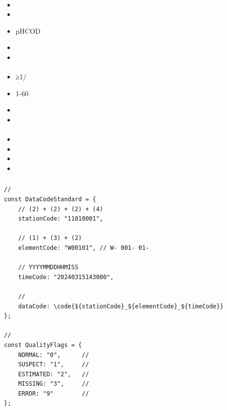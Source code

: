 \hypertarget{section-27}{%
\paragraph{}\label{section-27}}

\begin{itemize}
\item
  \important{}
\item
  \important{}
\item
  \important{}pHCOD
\item
  \important{}
\item
  \important{}
\end{itemize}

\hypertarget{section-28}{%
\paragraph{}\label{section-28}}

\begin{itemize}
\item
  \important{}≥1/
\item
  \important{}1-60
\item
  \important{}
\item
  \important{}
\end{itemize}

\hypertarget{section-29}{%
\paragraph{}\label{section-29}}

\begin{itemize}
\item
  \important{}
\item
  \important{}
\item
  \important{}
\item
  \important{}
\end{itemize}

\hypertarget{section-30}{%
\subsubsection{}\label{section-30}}

\begin{lstlisting}[style=javascript]
// 
const DataCodeStandard = {
    // (2) + (2) + (2) + (4)
    stationCode: "11010001",
    
    // (1) + (3) + (2)
    elementCode: "W00101", // W- 001- 01-
    
    // YYYYMMDDHHMISS
    timeCode: "20240315143000",
    
    // 
    dataCode: \code{${stationCode}_${elementCode}_${timeCode}}
};

// 
const QualityFlags = {
    NORMAL: "0",      // 
    SUSPECT: "1",     //  
    ESTIMATED: "2",   // 
    MISSING: "3",     // 
    ERROR: "9"        // 
};
\end{lstlisting}

